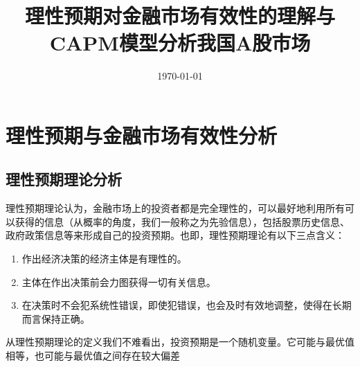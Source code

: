 \documentclass{xjtureport}
\title{理性预期对金融市场有效性的理解与CAPM模型分析我国A股市场}
\date{\today}
\begin{document}
\makecover
{}

\thispagestyle{fancy}

\rfoot{\thepage}
\tableofcontents
\clearpage


\section{理性预期与金融市场有效性分析}
\subsection{理性预期理论分析}
理性预期理论认为，金融市场上的投资者都是完全理性的，可以最好地利用所有可以获得的信息（从概率的角度，我们一般称之为先验信息），包括股票历史信息、政府政策信息等来形成自己的投资预期。也即，理性预期理论有以下三点含义：
\begin{enumerate}
    \item 作出经济决策的经济主体是有理性的。
    \item 主体在作出决策前会力图获得一切有关信息。
    \item 在决策时不会犯系统性错误，即使犯错误，也会及时有效地调整，使得在长期而言保持正确。
\end{enumerate}
\par 从理性预期理论的定义我们不难看出，投资预期是一个随机变量。它可能与最优值相等，也可能与最优值之间存在较大偏差
\end{document}
